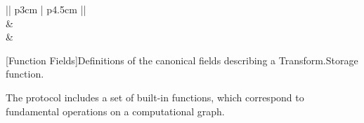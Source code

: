 \documentclass[9pt, oneside]{article}   	%
\begin{document}
\begin{multicols}{2}
\begin{flushleft}
\begin{tabular}{ || p{3cm} | p{4.5cm} ||}
\hline			
{} \\
\hline
{} &  \\
\hline
{} &  \\
\hline  
\end{tabular}
\end{flushleft}
[Function Fields]{Definitions of the canonical fields describing a Transform.Storage function.}
\label{functionFields}
\setlength{\parindent}{.5 cm}
\vspace{.25 cm}

The protocol includes a set of built-in functions, which correspond to fundamental operations on a computational graph. 

\end{multicols}
\end{document}
